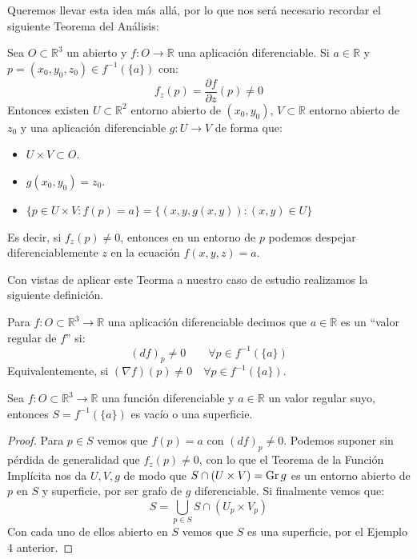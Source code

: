Queremos llevar esta idea más allá, por lo que nos será necesario recordar el siguiente Teorema del Análisis:
\begin{teo}
    Sea $O\subset\mathbb{R}^3$ un abierto y $f:O\to\mathbb{R}$ una aplicación diferenciable. Si $a\in \mathbb{R}$ y $p = (x_0,y_0,z_0)\in f^{-1}(\{a\})$ con:
    \begin{equation*}
        f_z(p) = \frac{\partial f}{\partial z}(p) \neq 0
    \end{equation*}
    Entonces existen $U\subset\mathbb{R}^2$ entorno abierto de $(x_0,y_0)$, $V\subset\mathbb{R}$ entorno abierto de $z_0$ y una aplicación diferenciable $g:U\to V$ de forma que:
    \begin{itemize}
        \item $U\times V\subset O$.
        \item $g(x_0,y_0) = z_0$.
        \item $\{p\in U\times V : f(p) = a\} = \{(x,y,g(x,y)):(x,y)\in U\}$
    \end{itemize}
\end{teo}

\noindent
Es decir, si $f_z(p)\neq 0$, entonces en un entorno de $p$ podemos despejar diferenciablemente $z$ en la ecuación $f(x,y,z)=a$.

Con vistas de aplicar este Teorma a nuestro caso de estudio realizamos la siguiente definición.

\begin{definicion}
    Para $f:O\subset\mathbb{R}^3\to\mathbb{R}$ una aplicación diferenciable decimos que $a\in \mathbb{R}$ es un ``valor regular de $f$'' si:
    \begin{equation*}
        (d f)_p\neq 0 \qquad \forall p\in f^{-1}(\{a\})
    \end{equation*}
    Equivalentemente, si $(\nabla f)(p)\neq 0 \quad \forall p\in f^{-1}(\{a\})$.
\end{definicion}

\begin{prop}
    Sea $f:O\subset\mathbb{R}^3\to\mathbb{R}$ una función diferenciable y $a\in \mathbb{R}$ un valor regular suyo, entonces $S=f^{-1}(\{a\})$ es vacío o una superficie.
    \begin{proof}
        Para $p\in S$ vemos que $f(p) = a$ con $(d f)_p\neq 0$. Podemos suponer sin pérdida de generalidad que $f_z(p)\neq 0$, con lo que el Teorema de la Función Implícita nos da $U,V,g$ de modo que $S\cap (U\times V) = \operatorname{Gr} g$ es un entorno abierto de $p$ en $S$ y superficie, por ser grafo de $g$ diferenciable. Si finalmente vemos que:
        \begin{equation*}
            S = \bigcup_{p\in S}S\cap (U_p\times V_p)
        \end{equation*}
        Con cada uno de ellos abierto en $S$ vemos que $S$ es una superficie, por el Ejemplo 4 anterior.
    \end{proof}
\end{prop}

